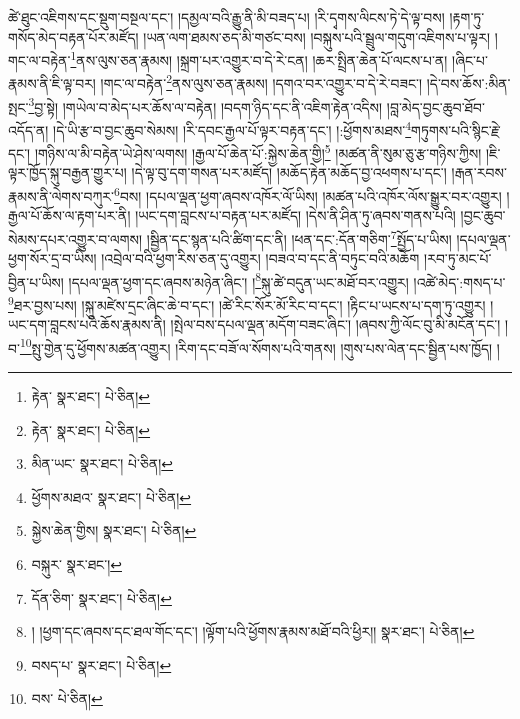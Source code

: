 ཚེ་ཐུང་འཇིགས་དང་སྡུག་བསྔལ་དང་། །དམྱལ་བའི་རྒྱུ་ནི་མི་བཟད་པ། །རི་དྭགས་ལིངས་ཏེ་དེ་ལྟ་བས། །རྟག་ཏུ་གསོད་མེད་བརྟན་པོར་མཛོད། །ཡན་ལག་ཐམས་ཅད་མི་གཙང་བས། །བསྐུས་པའི་སྦྲུལ་གདུག་འཇིགས་པ་ལྟར། །གང་ལ་བརྟེན་\footnote{རྟེན་  སྣར་ཐང་།  པེ་ཅིན། }ནས་ལུས་ཅན་རྣམས། །སྐྲག་པར་འགྱུར་བ་དེ་རེ་ངན། །ཆར་སྤྲིན་ཆེན་པོ་ལངས་པ་ན། །ཞིང་པ་རྣམས་ནི་ཇི་ལྟ་བར། །གང་ལ་བརྟེན་\footnote{རྟེན་  སྣར་ཐང་།  པེ་ཅིན། }ནས་ལུས་ཅན་རྣམས། །དགའ་བར་འགྱུར་བ་དེ་རེ་བཟང་། །དེ་བས་ཆོས་:མིན་སྤང་\footnote{མིན་ཡང་  སྣར་ཐང་།  པེ་ཅིན། }བྱ་སྟེ། །གཡེལ་བ་མེད་པར་ཆོས་ལ་བརྟེན། །བདག་ཉིད་དང་ནི་འཇིག་རྟེན་འདིས། །བླ་མེད་བྱང་ཆུབ་ཐོབ་འདོད་ན། །དེ་ཡི་རྩ་བ་བྱང་ཆུབ་སེམས། །རི་དབང་རྒྱལ་པོ་ལྟར་བརྟན་དང་། །:ཕྱོགས་མཐས་\footnote{ཕྱོགས་མཐའ་  སྣར་ཐང་།  པེ་ཅིན། }གཏུགས་པའི་སྙིང་རྗེ་དང་། །གཉིས་ལ་མི་བརྟེན་ཡེ་ཤེས་ལགས། །རྒྱལ་པོ་ཆེན་པོ་:སྐྱེས་ཆེན་གྱི།\footnote{སྐྱེས་ཆེན་གྱིས།  སྣར་ཐང་།  པེ་ཅིན། } །མཚན་ནི་སུམ་ཅུ་རྩ་གཉིས་ཀྱིས། །ཇི་ལྟར་ཁྱོད་སྐུ་བརྒྱན་གྱུར་པ། །དེ་ལྟ་བུ་དག་གསན་པར་མཛོད། །མཆོད་རྟེན་མཆོད་བྱ་འཕགས་པ་དང་། །རྒན་རབས་རྣམས་ནི་ལེགས་བཀུར་\footnote{བསྐུར་  སྣར་ཐང་། }བས། །དཔལ་ལྡན་ཕྱག་ཞབས་འཁོར་ལོ་ཡིས། །མཚན་པའི་འཁོར་ལོས་སྒྱུར་བར་འགྱུར། །རྒྱལ་པོ་ཆོས་ལ་རྟག་པར་ནི། །ཡང་དག་བླངས་པ་བརྟན་པར་མཛོད། །དེས་ནི་ཤིན་ཏུ་ཞབས་གནས་པའི། །བྱང་ཆུབ་སེམས་དཔར་འགྱུར་བ་ལགས། །སྦྱིན་དང་སྙན་པའི་ཚིག་དང་ནི། །ཕན་དང་:དོན་གཅིག་\footnote{དོན་ཅིག་  སྣར་ཐང་།  པེ་ཅིན། }སྤྱོད་པ་ཡིས། །དཔལ་ལྡན་ཕྱག་སོར་དྲ་བ་ཡིས། །འབྲེལ་བའི་ཕྱག་རིས་ཅན་དུ་འགྱུར། །བཟའ་བ་དང་ནི་བཏུང་བའི་མཆོག །རབ་ཏུ་མང་པོ་བྱིན་པ་ཡིས། །དཔལ་ལྡན་ཕྱག་དང་ཞབས་མཉེན་ཞིང་། །\footnote{། །ཕྱག་དང་ཞབས་དང་ཐལ་གོང་དང་། །ལྟོག་པའི་ཕྱོགས་རྣམས་མཐོ་བའི་ཕྱིར།།  སྣར་ཐང་།  པེ་ཅིན། }སྐུ་ཚེ་བདུན་ཡང་མཐོ་བར་འགྱུར། །འཚེ་མེད་:གསད་པ་\footnote{བསད་པ་  སྣར་ཐང་།  པེ་ཅིན། }ཐར་བྱས་པས། །སྐུ་མཛེས་དྲང་ཞིང་ཆེ་བ་དང་། །ཚེ་རིང་སོར་མོ་རིང་བ་དང་། །རྟིང་པ་ཡངས་པ་དག་ཏུ་འགྱུར། །ཡང་དག་བླངས་པའི་ཆོས་རྣམས་ནི། །སྤེལ་བས་དཔལ་ལྡན་མདོག་བཟང་ཞིང་། །ཞབས་ཀྱི་ལོང་བུ་མི་མངོན་དང་། །བ་\footnote{བས་  པེ་ཅིན། }སྤུ་གྱེན་དུ་ཕྱོགས་མཚན་འགྱུར། །རིག་དང་བཟོ་ལ་སོགས་པའི་གནས། །གུས་པས་ལེན་དང་སྦྱིན་པས་ཁྱོད། །

